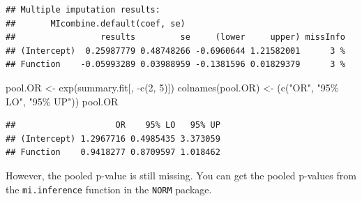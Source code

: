 \documentclass[
]{book}
\newenvironment{Shaded}{\begin{snugshade}}{\end{snugshade}}
\newcommand{\AttributeTok}[1]{\textcolor[rgb]{0.77,0.63,0.00}{#1}}
\newcommand{\ControlFlowTok}[1]{\textcolor[rgb]{0.13,0.29,0.53}{\textbf{#1}}}
\newcommand{\DecValTok}[1]{\textcolor[rgb]{0.00,0.00,0.81}{#1}}
\newcommand{\FunctionTok}[1]{\textcolor[rgb]{0.00,0.00,0.00}{#1}}
\newcommand{\NormalTok}[1]{#1}
\newcommand{\OtherTok}[1]{\textcolor[rgb]{0.56,0.35,0.01}{#1}}
\newcommand{\SpecialCharTok}[1]{\textcolor[rgb]{0.00,0.00,0.00}{#1}}
\newcommand{\StringTok}[1]{\textcolor[rgb]{0.31,0.60,0.02}{#1}}
\begin{document}
\begin{verbatim}
## Multiple imputation results:
##       MIcombine.default(coef, se)
##                 results         se     (lower     upper) missInfo
## (Intercept)  0.25987779 0.48748266 -0.6960644 1.21582001      3 %
## Function    -0.05993289 0.03988959 -0.1381596 0.01829379      3 %
\end{verbatim}

\begin{Shaded}
\begin{Highlighting}[]
\NormalTok{pool.OR }\OtherTok{\textless{}{-}} \FunctionTok{exp}\NormalTok{(summary.fit[, }\SpecialCharTok{{-}}\FunctionTok{c}\NormalTok{(}\DecValTok{2}\NormalTok{, }\DecValTok{5}\NormalTok{)]) }
\FunctionTok{colnames}\NormalTok{(pool.OR) }\OtherTok{\textless{}{-}}\NormalTok{ (}\FunctionTok{c}\NormalTok{(}\StringTok{"OR"}\NormalTok{, }\StringTok{"95\% LO"}\NormalTok{, }\StringTok{"95\% UP"}\NormalTok{))}
\NormalTok{pool.OR}
\end{Highlighting}
\end{Shaded}

\begin{verbatim}
##                    OR    95% LO   95% UP
## (Intercept) 1.2967716 0.4985435 3.373059
## Function    0.9418277 0.8709597 1.018462
\end{verbatim}

However, the pooled p-value is still missing. You can get the pooled p-values from the \texttt{mi.inference} function in the \texttt{NORM} package.

\begin{Shaded}
\end{Shaded}
\end{document}
